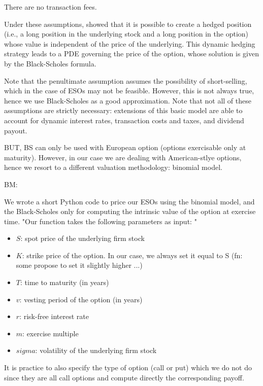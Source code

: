     \begin{assumption}
        There are no transaction fees.
    \end{assumption}
    
    Under these assumptions, \cite{black1973pricing} showed that it is possible to create a hedged position (i.e., a long position in the underlying stock and a long position in the option) whose value is independent of the price of the underlying. This dynamic hedging strategy leads to a PDE governing the price of the option, whose solution is given by the Black-Scholes formula.

    Note that the penultimate assumption assumes the possibility of short-selling, which in the case of ESOs may not be feasible. However, this is not always true, hence we use Black-Scholes as a good approximation. Note that not all of these assumptions are strictly necessary: extensions of this basic model are able to account for dynamic interest rates, transaction costs and taxes, and dividend payout.  


    BUT, BS can only be used with European option (options exercisable only at maturity). However, in our case we are dealing with American-stlye options, hence we resort to a different valuation methodology: binomial model.

BM: 



We wrote a short Python code to price our ESOs using the binomial model, and the Black-Scholes only for computing the intrinsic value of the option at exercise time.
"Our function takes the following parameters as input: "
\begin{itemize}
    \item $S$: spot price of the underlying firm stock
    \item $K$: strike price of the option. In our case, we always set it equal to S (fn: some propose to set it slightly higher ...)
    \item $T$: time to maturity (in years)
    \item $v$: vesting period of the option (in years)
    \item $r$: risk-free interest rate
    \item $m$: exercise multiple
    \item $sigma$: volatility of the underlying firm stock
\end{itemize}
    
    It is practice to also specify the type of option (call or put) which we do not do since they are all call options and compute directly the corresponding payoff.







